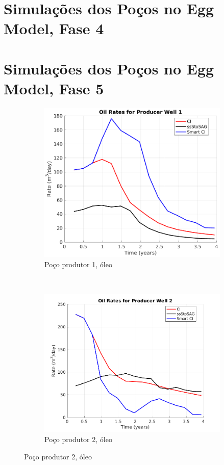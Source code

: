 \chapter{Simula\c{c}\~{o}es dos Po\c{c}os no Egg Model, Fase 4}\label{apn:egg4}


\chapter{Simula\c{c}\~{o}es dos Po\c{c}os no Egg Model, Fase 5}\label{apn:egg5}

\begin{figure}[!ht]
	\centering
	\begin{subfigure}[b]{.3\textwidth}
		\includegraphics[width=\textwidth]{figs/resultadosEgg/imgsim5/EGG_OilWell1_Zoom}
		\caption{Po\c{c}o produtor 1, \'{o}leo}
		\label{EGG5_OilWell1}
	\end{subfigure}
	~
	\begin{subfigure}[b]{.3\textwidth}
		\includegraphics[width=\textwidth]{figs/resultadosEgg/imgsim5/EGG_OilWell2_Zoom}
		\caption{Po\c{c}o produtor 2, \'{o}leo}
		\label{EGG5_OilWell2}
	\end{subfigure}
	

\end{figure}
